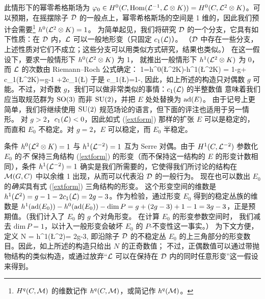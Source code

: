 此情形下的幂零希格斯场为 $\varphi_0\in H^0(C,{\mathrm{Hom}}({\mathcal L}^{-1},{\mathcal L}\otimes K))=H^0(C, {\mathcal L}^2\otimes K)$。可以预期，在摇摆除子 ${\mathcal D}$ 的一般点上，幂零希格斯场的空间是 1 维的，因此我们预计会需要\footnote{$H^q(C,{\mathcal M})$ 的维数记作 $h^q(C,{\mathcal M})$，或简记作 $h^q({\mathcal M})$。} $h^0({\mathcal L}^2\otimes K)= 1$。
为简单起见，我们将研究 ${\mathcal D}$ 的一个分支，它具有如下性质：在 ${\mathcal D}$ 内，${\mathcal L}$ 可以一般地形变（只固定 $c_1({\mathcal L})$）。
（${\mathcal D}$ 中存在一些分支，上述性质对它们不成立；这些分支可以用类似方式研究，结果也类似。）
在这一假设下，要求一般情形下 $h^0({\mathcal L}^2\otimes K)$ 为 1，
就推出一般情形下 $h^1({\mathcal L}^2\otimes K)$ 为 0，而 ${\mathcal L}$ 的次数由 Riemann–Roch 公式确定：
\be\label{degl} 1=h^0(\L^2\otimes K)-h^1(\L^2\otimes K) = 1-g+ c_1(\L^2\otimes K)=g-1 +2c_1(\L)\ee
于是
\be\label{egf}c_1(\L)=1-,\ee
因此，如上所述的构造只对偶数 $g$ 可能。不过，对奇数 $g$，我们可以做非常类似的事情：$c_1({\mathcal L})$ 的半整数值
意味着我们应当取规范群为 ${\mathrm{SO}}(3)$ 而非 ${\mathrm{SU}}(2)$，并把 $E$ 处处替换为 ${\mathrm{ad}}(E)$。
由于记号上更简单，我们将继续使用
${\mathrm{SU}}(2)$ 规范场论的语言，但下面的评注也适用于另一情形。
对 $g>2$，$c_1({\mathcal L})<0$，因此如式 (\ref{extform}) 那样的扩张 $E$ 可以是稳定的，而直和 $E_0$ 不稳定。对 $g=2$，$E$ 可以稳定，而 $E_0$ 半稳定。

条件 $h^0({\mathcal L}^2\otimes K)=1$ 与 $h^1({\mathcal L}^{-2})=1$ 互为 Serre 对偶。由于 $H^1(C,{\mathcal L}^{-2})$ 参数化 $E_0$ 的{\it 不}
保持三角结构 (\ref{extform}) 的形变（而不保持这一结构的 $E$ 的形变计数相同），条件
$h^1({\mathcal L}^{-2})=1$ 确实是我们所需要的，它使得我们所讨论的结构在 ${\mathcal M}(G,C)$ 中以余维 1 出现，从而可以代表沿 ${\mathcal D}$ 的一般行为。
现在也可以数出 $E_0$ 的{\it 确实}具有式 (\ref{extform}) 三角结构的形变。
这个形变空间的维数是
$h^1({\mathcal L}^2)=g-1-2c_1({\mathcal L}) =2g-3$。作为检验，通过形变 $E_0$ 得到的稳定丛族的维数是
$h^1({\mathrm{ad}}(E_0)) - h^0({\mathrm{ad}}(E_0))-\mathrm{dim}\,P = g + (2g-3)+1 -1 =3g-3$，正是预期值。（我们计入了 $E_0$ 的 $g$ 个对角形变。
在计算 $E_0$ 的形变参数空间时，
我们减去 ${\mathrm{dim}}\,P=1$，以计入一般形变会破坏 $E_0$ 的 $P$-不变性这一事实。）
为下文方便，定义
\be\label{weddo} N = h^1(\L^2)= 2g-3,\ee
即沿除子 ${\mathcal D}$ 的不稳定丛 $E_0$ 的上三角部分的形变数目。因此，如上所述的构造只给出 $N$ 的正奇数值；
不过，正偶数值可以通过带抛物结构的类似构造，或通过放弃“${\mathcal L}$ 可以在保持在 ${\mathcal D}$ 内的同时任意形变”这一假设来得到。



